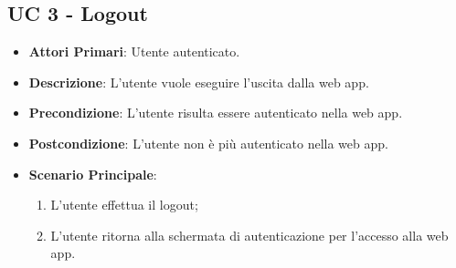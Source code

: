 		\subsection{UC 3 - Logout}
		\begin{itemize}
			\item \textbf{Attori Primari}: Utente autenticato.
			\item \textbf{Descrizione}: L'utente vuole eseguire l'uscita dalla web app.
			\item \textbf{Precondizione}: L'utente risulta essere autenticato nella web app.
			\item \textbf{Postcondizione}: L'utente non è più autenticato nella web app.
			\item \textbf{Scenario Principale}:
			\begin{enumerate}
				\item L'utente effettua il logout;
				\item L'utente ritorna alla schermata di autenticazione per l'accesso alla web app.
			\end{enumerate}	
		\end{itemize}


		


		



		


		



		


